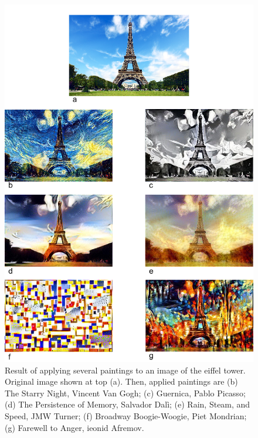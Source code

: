 \documentclass[11pt,letterpaper,journal]{IEEEtran}
\begin{document}
\begin{figure}[h]
  \centering
  \includegraphics[width=0.8\linewidth]{eiffel.png}
  \caption{Result of applying several paintings to an image of the eiffel
  tower. Original image shown at top (a). Then, applied paintings are (b)  The
  Starry Night, Vincent Van Gogh; (c) Guernica, Pablo Picasso; (d) The
  Persistence of Memory, Salvador Dal\`i; (e) Rain, Steam, and Speed, JMW
  Turner; (f) Broadway Boogie-Woogie, Piet Mondrian; (g) Farewell to Anger,
  ieonid Afremov.}
  \label{fig:eiffel}
\end{figure}
\end{document}

